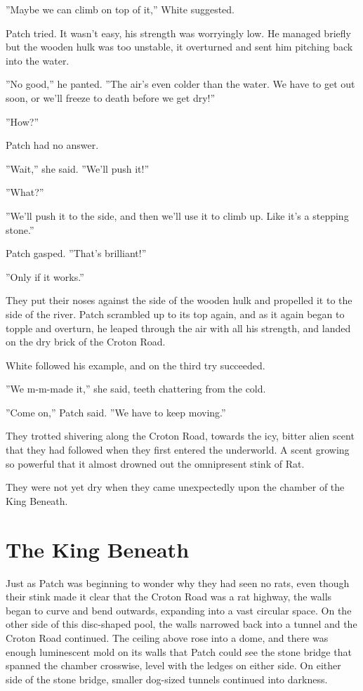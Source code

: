 \documentclass[12pt]{book}
\begin{document}
''Maybe we can climb on top of it,'' White suggested.

Patch tried. It wasn't easy, his strength was worryingly low. He managed briefly %
but the wooden hulk was too unstable, it overturned and sent him pitching back into the water.

''No good,'' he panted. ''The air's even colder than the water. We have to get out soon, or we'll freeze to death before we get dry!''

''How?''

Patch had no answer.

''Wait,'' she said. ''We'll push it!''

''What?''

''We'll push it to the side, and then we'll use it to climb up. Like it's a stepping stone.''

Patch gasped. ''That's brilliant!''

''Only if it works.''

They put their noses against the side of the wooden hulk and propelled it to the side of the river. Patch scrambled up to its top again, and as it again began to topple and overturn, he leaped through the air with all his strength, and landed on the dry brick of the Croton Road.

White followed his example, and on the third try succeeded.

''We m-m-made it,'' she said, teeth chattering from the cold.

''Come on,'' Patch said. ''We have to keep moving.''

They trotted shivering along the Croton Road, towards the icy, bitter alien scent that they had followed when they first entered the underworld. A scent growing so powerful that it almost drowned out the omnipresent stink of Rat.

They were not yet dry when they came unexpectedly upon the chamber of the King Beneath.


\section{The King Beneath}

Just as Patch was beginning to wonder why they had seen no rats, even though their stink made it clear that the Croton Road was a rat highway, the walls began to curve and bend outwards, expanding into a vast circular space. On the other side of this disc-shaped pool, the walls narrowed back into a tunnel and the Croton Road continued. The ceiling above rose into a dome, and there was enough luminescent mold on its walls that Patch could see the stone bridge that spanned the chamber crosswise, level with the ledges on either side. On either side of the stone bridge, smaller dog-sized tunnels continued into darkness.
\end{document}
